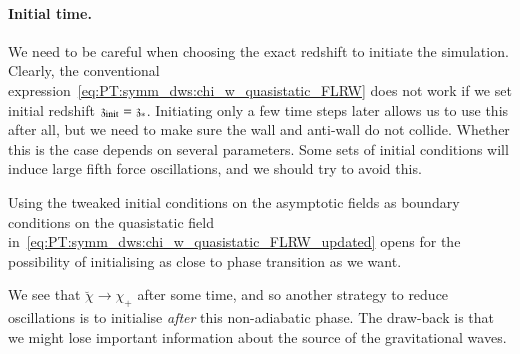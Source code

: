 

    








    \paragraph{Initial time.} %
    We need to be careful when choosing the exact redshift to initiate the simulation. Clearly, the conventional expression~\cref{eq:PT:symm_dws:chi_w_quasistatic_FLRW} does not work if we set initial redshift $\mathfrak{z}_\mathrm{init}=\mathfrak{z}_\ast$. Initiating only a few time steps later allows us to use this after all, but we need to make sure the wall and anti-wall do not collide. Whether this is the case depends on several parameters. Some sets of initial conditions will induce large fifth force oscillations, and we should try to avoid this.

    Using the tweaked initial conditions on the asymptotic fields as boundary conditions on the quasistatic field in~\cref{eq:PT:symm_dws:chi_w_quasistatic_FLRW_updated} opens for the possibility of initialising as close to phase transition as we want. 
    
    We see that $\breve{\chi}\to \chi_+ $ after some time, and so another strategy to reduce oscillations is to initialise \emph{after} this non-adiabatic phase. The draw-back is that we might lose important information about the source of the gravitational waves.

